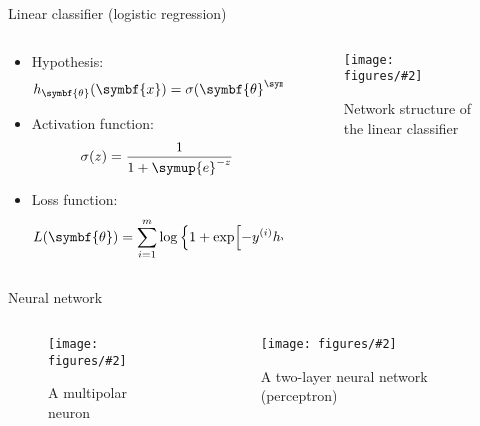 \documentclass[aspectratio=169]{beamer}
\def\ee{{\symup{e}}}
\def\trans{{\symup{T}}}
\def\bm#1{{\symbf{#1}}}
\newcommand\imageinput[2][]{\texttt{[image: figures/\#2]}}
\begin{document}
\begin{frame}{Linear classifier (logistic regression)}
\begin{columns}[t]
  \begin{column}{0.52\textwidth}
    \begin{itemize}
      \item Hypothesis:
        \[ h_\bm{\theta} (\bm{x}) = \sigma(\bm{\theta}^\trans \bm{x}) \]
      \item Activation function:
        \[ \sigma(z) = \frac{1}{1+\ee^{-z}} \]
      \item Loss function:
        \[
          L(\bm{\theta})
          = \sum_{i=1}^m \log\qty\Big{1+\exp[-y^{(i)} h_\bm{\theta}\qty\big(\bm{x}^{(i)})]}
        \]
    \end{itemize}
  \end{column}
  \begin{column}{0.44\textwidth}
    \begin{figure}
      \centering
      \imageinput[width=0.9\textwidth]{linear-layer}
      \caption{Network structure of the linear classifier}
    \end{figure}
  \end{column}
\end{columns}
\end{frame}

\begin{frame}{Neural network}
\begin{columns}[t]
  \begin{column}{0.44\textwidth}
    \begin{figure}
      \centering
      \imageinput[height=3.8cm]{multipolar-neuron.png}
      \caption{A multipolar neuron \footnotemark}
    \end{figure}
  \end{column}
  \begin{column}{0.54\textwidth}
    \begin{figure}
      \centering
      \imageinput[height=3.8cm]{neural-net}
      \caption{A two-layer neural network (perceptron)}
    \end{figure}
  \end{column}
\end{columns}
\end{frame}
\end{document}
